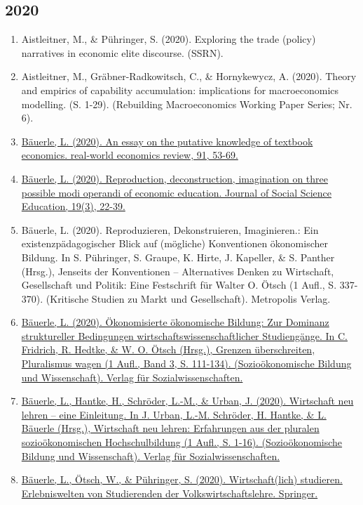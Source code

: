 \subsection*{2020}
\begin{enumerate}
	 \item Aistleitner, M., \& Pühringer, S. (2020). Exploring the trade (policy) narratives in economic elite discourse. (SSRN).
	 \item Aistleitner, M., Gräbner-Radkowitsch, C., \& Hornykewycz, A. (2020). Theory and empirics of capability accumulation: implications for macroeconomics modelling. (S. 1-29). (Rebuilding Macroeconomics Working Paper Series; Nr. 6).
	 \item \href{https://www.paecon.net/PAEReview/issue91/Bauerle91.pdf}{Bäuerle, L. (2020). An essay on the putative knowledge of textbook economics. real-world economics review, 91, 53-69.}
	 \item \href{https://doi.org/10.4119/jsse-3378}{Bäuerle, L. (2020). Reproduction, deconstruction, imagination on three possible modi operandi of economic education. Journal of Social Science Education, 19(3), 22-39.}
	 \item Bäuerle, L. (2020). Reproduzieren, Dekonstruieren, Imaginieren.: Ein existenzpädagogischer Blick auf (mögliche) Konventionen ökonomischer Bildung. In S. Pühringer, S. Graupe, K. Hirte, J. Kapeller, \& S. Panther (Hrsg.), Jenseits der Konventionen -- Alternatives Denken zu Wirtschaft, Gesellschaft und Politik: Eine Festschrift für Walter O. Ötsch (1 Aufl., S. 337-370). (Kritische Studien zu Markt und Gesellschaft). Metropolis Verlag.
	 \item \href{https://doi.org/10.1007/978-3-658-29642-1_7}{Bäuerle, L. (2020). Ökonomisierte ökonomische Bildung: Zur Dominanz struktureller Bedingungen wirtschaftswissenschaftlicher Studiengänge. In C. Fridrich, R. Hedtke, \& W. O. Ötsch (Hrsg.), Grenzen überschreiten, Pluralismus wagen (1 Aufl., Band 3, S. 111-134). (Sozioökonomische Bildung und Wissenschaft). Verlag für Sozialwissenschaften.}
	 \item \href{https://doi.org/10.1007/978-3-658-30920-6_1}{Bäuerle, L., Hantke, H., Schröder, L.-M., \& Urban, J. (2020). Wirtschaft neu lehren – eine Einleitung. In J. Urban, L.-M. Schröder, H. Hantke, \& L. Bäuerle (Hrsg.), Wirtschaft neu lehren: Erfahrungen aus der pluralen sozioökonomischen Hochschulbildung (1 Aufl., S. 1-16). (Sozioökonomische Bildung und Wissenschaft). Verlag für Sozialwissenschaften.}
	 \item \href{https://doi.org/10.1007/978-3-658-30057-9}{Bäuerle, L., Ötsch, W., \& Pühringer, S. (2020). Wirtschaft(lich) studieren. Erlebniswelten von Studierenden der Volkswirtschaftslehre. Springer.}

\end{enumerate}
